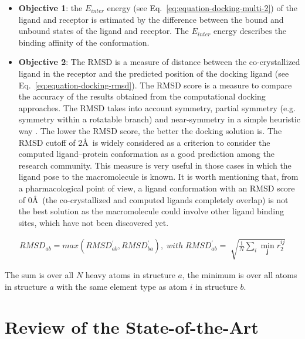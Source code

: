 \begin{itemize}
\item \textbf{Objective 1}: the $E_{inter}$ energy (see Eq.~\ref{eq:equation-docking-multi-2}) of the ligand and receptor is estimated by the difference between the bound and unbound states of the ligand and receptor. The $E_{inter}$ energy describes the binding affinity of the conformation.

\item \textbf{Objective 2}: The RMSD is a measure of distance between the co-crystallized ligand in the receptor and the predicted position of the docking ligand (see Eq.~\ref{eq:equation-docking-rmsd}). The RMSD score is a measure to compare the accuracy of the results obtained from the computational docking approaches. The RMSD takes into account symmetry, partial symmetry (e.g. symmetry within a rotatable branch) and near-symmetry in a simple heuristic way \cite{Trott2010}. The lower the RMSD score, the better the docking solution is. The RMSD cutoff of 2\AA\ is widely considered as a criterion to consider the computed ligand–protein conformation as a good prediction among the research community. This measure is very useful in those cases in which the ligand pose to the macromolecule is known. It is worth mentioning that, from a pharmacological point of view, a ligand conformation with an RMSD score of 0\AA\ (the co-crystallized and computed ligands completely overlap) is not the best solution as the macromolecule could involve other ligand binding sites, which have not been discovered yet.

\end{itemize}

\begin{equation}
\label{eq:equation-docking-rmsd}
\begin{split}
RMSD_{ab} = max(RMSD_{ab}^{'}, RMSD_{ba}^{'}), \; with \; RMSD_{ab}^{'} = \sqrt[]{\frac{1}{N}\sum_{i} \mathop{min}_{\textbf{j}} r_{2}^{ij}}
\end{split}
\end{equation}

The sum is over all $N$ heavy atoms in structure $a$, the minimum is over all atoms in structure $a$ with the same element type as atom $i$ in structure $b$.

\section{Review of the State-of-the-Art}
\label{sec:reviewStateArt}


